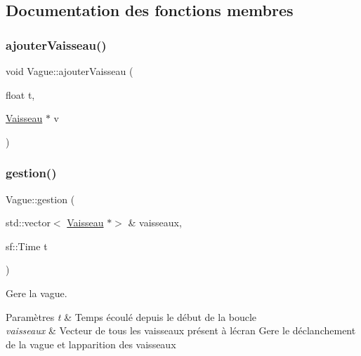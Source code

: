 \subsection{Documentation des fonctions membres}
\mbox{\label{class_vague_a82124cdeb165825047f9dd8164e69a16}} 
\subsubsection{\texorpdfstring{ajouter\+Vaisseau()}{ajouterVaisseau()}}
{\footnotesize\ttfamily void Vague\+::ajouter\+Vaisseau (\begin{DoxyParamCaption}\item[{float}]{t,  }\item[{\hyperlink{class_vaisseau}{Vaisseau} $\ast$}]{v }\end{DoxyParamCaption})}

\mbox{\label{class_vague_a37649d5f8063b1d516ce1f865a9d521d}} 
\subsubsection{\texorpdfstring{gestion()}{gestion()}}
{\footnotesize\ttfamily Vague\+::gestion (\begin{DoxyParamCaption}\item[{std\+::vector$<$ \hyperlink{class_vaisseau}{Vaisseau} $\ast$$>$ \&}]{vaisseaux,  }\item[{sf\+::\+Time}]{t }\end{DoxyParamCaption})}



Gere la vague. 


\begin{DoxyParams}{Paramètres}
{\em t} & Temps écoulé depuis le début de la boucle \\
\hline
{\em vaisseaux} & Vecteur de tous les vaisseaux présent à l\textquotesingle{}écran Gere le déclanchement de la vague et l\textquotesingle{}apparition des vaisseaux \\
\hline
\end{DoxyParams}
\mbox{\label{class_vague_a1d927f38da46323e72208aaeb1b07d5b}} 
